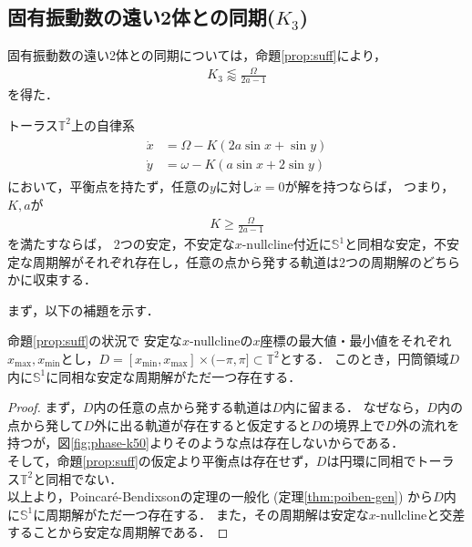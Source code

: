 \documentclass[../main]{subfiles}
\begin{document}
    \subsection{固有振動数の遠い2体との同期($K_3$)}
    \label{sec:3body-k3}
    固有振動数の遠い2体との同期については，命題\ref{prop:suff}により，
    \begin{align*}
        K_3\lessapprox \frac{\Omega}{2a-1}
    \end{align*}
    を得た．
    \begin{proposition}
        \label{prop:suff}
        トーラス$\mathbb{T}^2$上の自律系
        \begin{align}
            \label{eq:prop-2phase}
            \begin{split}
                \dot{x}&=\Omega-K(2a\sin x+\sin y)\\
                \dot{y}&=\omega-K(a\sin x+2\sin y)
            \end{split}
        \end{align}
        において，平衡点を持たず，任意の$y$に対し$\dot{x}=0$が解を持つならば，
        つまり，$K,a$が
        \begin{align*}
            K\geq \frac{\Omega}{2a-1}
        \end{align*}
        を満たすならば，
        2つの安定，不安定な$x$-$\mathrm{nullcline}$付近に$\mathbb{S}^1$と同相な安定，不安定な周期解がそれぞれ存在し，任意の点から発する軌道は2つの周期解のどちらかに収束する．
    \end{proposition}
    まず，以下の補題を示す．
    \begin{lemma}
        \label{lemma:annulus}
        命題\ref{prop:suff}の状況で
        安定な$x$-nullclineの$x$座標の最大値・最小値をそれぞれ$x_{\max},x_{\min}$とし，$D=[x_{\min},x_{\max}]\times (-\pi,\pi ]\subset\mathbb{T}^2$とする．
        このとき，円筒領域$D$内に$\mathbb{S}^1$に同相な安定な周期解がただ一つ存在する．        
    \end{lemma}
    \begin{proof}
        まず，$D$内の任意の点から発する軌道は$D$内に留まる．
        なぜなら，$D$内の点から発して$D$外に出る軌道が存在すると仮定すると$D$の境界上で$D$外の流れを持つが，図\ref{fig:phase-k50}よりそのような点は存在しないからである．\\
        そして，命題\ref{prop:suff}の仮定より平衡点は存在せず，$D$は円環に同相でトーラス$\mathbb{T}^2$と同相でない．\\
        以上より，Poincaré-Bendixsonの定理の一般化 (定理\ref{thm:poiben-gen}) から$D$内に$\mathbb{S}^1$に周期解がただ一つ存在する．
        また，その周期解は安定な$x$-nullclineと交差することから安定な周期解である．        
    \end{proof}
\end{document}
